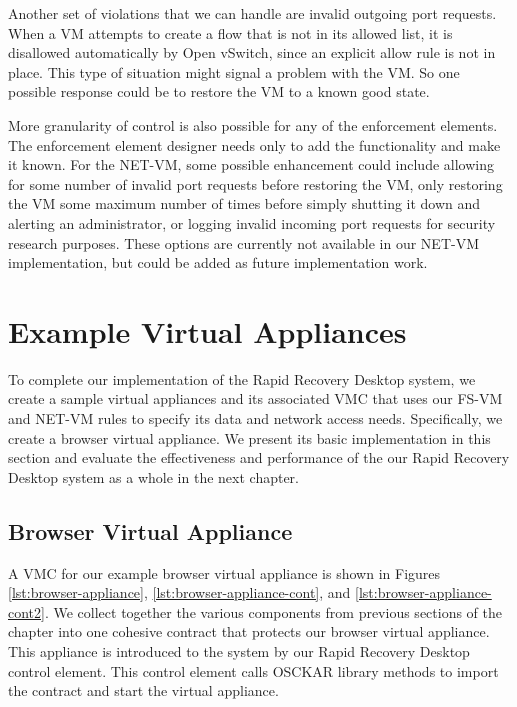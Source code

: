 Another set of violations that we can handle are invalid outgoing port requests. When a VM attempts to create a flow that is not in its allowed list, it is disallowed automatically by Open vSwitch, since an explicit allow rule is not in place. This type of situation might signal a problem with the VM. So one possible response could be to restore the VM to a known good state.

More granularity of control is also possible for any of the enforcement elements. The enforcement element designer needs only to add the functionality and make it known. For the NET-VM, some possible enhancement could include allowing for some number of invalid port requests before restoring the VM, only restoring the VM some maximum number of times before simply shutting it down and alerting an administrator, or logging invalid incoming port requests for security research purposes. These options are currently not available in our NET-VM implementation, but could be added as future implementation work.

\section{Example Virtual Appliances}
\label{sec:example-appliances-implementation}

To complete our implementation of the Rapid Recovery Desktop system, we create a sample virtual appliances and its associated VMC that uses our FS-VM and NET-VM rules to specify its data and network access needs. Specifically, we create a browser virtual appliance. We present its basic implementation in this section and evaluate the effectiveness and performance of the our Rapid Recovery Desktop system as a whole in the next chapter.

\subsection{Browser Virtual Appliance}

A VMC for our example browser virtual appliance is shown in Figures \ref{lst:browser-appliance}, \ref{lst:browser-appliance-cont}, and \ref{lst:browser-appliance-cont2}. We collect together the various components from previous sections of the chapter into one cohesive contract that protects our browser virtual appliance. This appliance is introduced to the system by our Rapid Recovery Desktop control element. This control element calls OSCKAR library methods to import the contract and start the virtual appliance. 

